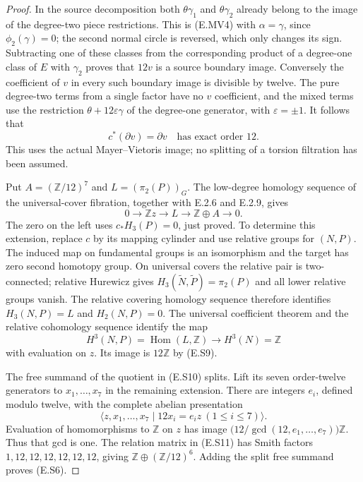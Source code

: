 \begin{proof}
In the source decomposition both $\theta\gamma_1$ and
$\theta\gamma_2$ already belong to the image of the degree-two
piece restrictions. This is (E.MV4) with $\alpha=\gamma$,
since $\phi_2(\gamma)=0$; the second normal circle is reversed,
which only changes its sign. Subtracting one of these classes
from the corresponding product of a degree-one class of $E$
with $\gamma_2$ proves that $12v$ is a source boundary image.
Conversely the coefficient of $v$ in every such boundary image
is divisible by twelve. The pure degree-two terms from a single
factor have no $v$ coefficient, and the mixed terms use the
restriction $\theta+12\varepsilon\gamma$ of the degree-one
generator, with $\varepsilon=\pm1$. It follows that
\[
                  c^*(\partial v)=\partial v
        \quad\text{has exact order }12.
 \tag{E.S9}
\]
This uses the actual Mayer--Vietoris image; no splitting of a
torsion filtration has been assumed.

Put $A=(\mathbb Z/12)^7$ and $L=(\pi_2(P))_G$.
The low-degree homology sequence of the universal-cover
fibration, together with E.2.6 and E.2.9, gives
\[
             0\longrightarrow\mathbb Z z\longrightarrow L
                \longrightarrow\mathbb Z\oplus A\longrightarrow0.
 \tag{E.S10}
\]
The zero on the left uses $c_*H_3(P)=0$, just proved.
To determine this extension, replace $c$ by its mapping cylinder
and use relative groups for $(N,P)$. The induced map on fundamental
groups is an isomorphism and the target has zero second homotopy
group. On universal covers the relative pair is two-connected;
relative Hurewicz gives
$H_3(\widetilde N,\widetilde P)=\pi_2(P)$ and all lower relative
groups vanish. The relative covering homology sequence therefore
identifies $H_3(N,P)=L$ and $H_2(N,P)=0$.
The universal coefficient theorem and the relative cohomology
sequence identify the map
\[
       H^3(N,P)=\operatorname{Hom}(L,\mathbb Z)
         \longrightarrow H^3(N)=\mathbb Z
\]
with evaluation on $z$. Its image is $12\mathbb Z$ by (E.S9).

The free summand of the quotient in (E.S10) splits. Lift its
seven order-twelve generators to $x_1,\ldots,x_7$ in the
remaining extension. There are integers $e_i$, defined modulo
twelve, with the complete abelian presentation
\[
        \langle z,x_1,\ldots,x_7\mid
                      12x_i=e_i z\ (1\leq i\leq7)\rangle.
 \tag{E.S11}
\]
Evaluation of homomorphisms to $\mathbb Z$ on $z$ has image
$\bigl(12/\gcd(12,e_1,\ldots,e_7)\bigr)\mathbb Z$.
Thus that gcd is one. The relation matrix in (E.S11) has
Smith factors $1,12,12,12,12,12,12$, giving
$\mathbb Z\oplus(\mathbb Z/12)^6$. Adding the split free
summand proves (E.S6).


\end{proof}
